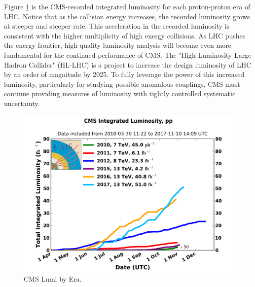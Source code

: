 Figure \ref{fig:lumiCMSEra} is the CMS-recorded integrated luminosity for each proton-proton era of LHC. Notice that as the collision energy increases, the recorded luminosity grows at steeper and steeper rate. This acceleration in the recorded luminosity is consistent with the higher multiplicity of high energy collisions. As LHC pushes the energy frontier, high quality luminosity analysis will become even more fundamental for the continued performance of CMS. The "High Luminosity Large Hadron Collider" (HL-LHC) is a project to increase the design luminosity of LHC by an order of magnitude by 2025. To fully leverage the power of this increased luminosity, particularly for studying possible anomalous couplings, CMS must continue providing measures of luminosity with tightly controlled systematic uncertainty. 

\begin{figure}[h!]
\begin{centering}
\includegraphics[width=5in]{Chapter4/importfigs/int_lumi_cumulative_pp_2.png}
\par\end{centering}
\caption{CMS Lumi by Era. \label{fig:lumiCMSEra}}
\end{figure}